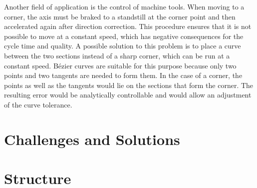  \bigskip
 

Another field of application is the control of machine tools. When moving to a corner, the axis must be braked to a standstill at the corner point and then accelerated again after direction correction. This procedure ensures that it is not possible to move at a constant speed, which has negative consequences for the cycle time and quality. A possible solution to this problem is to place a curve between the two sections instead of a sharp corner, which can be run at a constant speed. Bézier curves are suitable for this purpose because only two points and two tangents are needed to form them. In the case of a corner, the points as well as the tangents would lie on the sections that form the corner. The resulting error would be analytically controllable and would allow an adjustment of the curve tolerance.\cite{Sencer:2014}

\section{Challenges and Solutions}

\section{Structure}